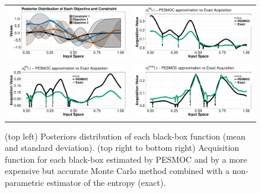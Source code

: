 \begin{figure}[htb]
\begin{center}
\begin{tabular}{cc}
        \includegraphics[width=0.45\linewidth]{Figures/acquisition/plot_posterior.pdf} &
        \includegraphics[width=0.45\linewidth]{Figures/acquisition/plot_acq_obj_1.pdf} \\
        \includegraphics[width=0.45\linewidth]{Figures/acquisition/plot_acq_obj_2.pdf} &
        \includegraphics[width=0.45\linewidth]{Figures/acquisition/plot_acq_con_1.pdf}
\end{tabular}
\caption{(top left) Posteriors distribution of each black-box function (mean and standard deviation).
        (top right to bottom right) Acquisition function for each black-box estimated by PESMOC and by a
        more expensive but accurate Monte Carlo method combined with a non-parametric estimator of the entropy (exact).
        }
        \label{fig:exact_decoupled}
\end{center}
\end{figure}

